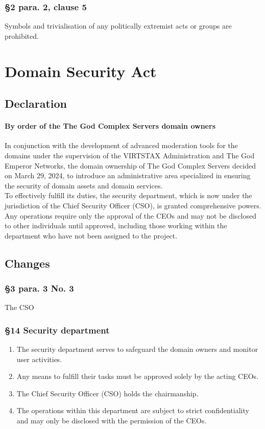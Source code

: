 \documentclass{cjs9}
\begin{document}
\subsubsection*{§2 para. 2, clause 5}
Symbols and trivialisation of any politically extremist acts or groups are prohibited.
\newpage
\section{Domain Security Act}
\subsection{Declaration}
\paragraph{By order of the The God Complex Servers domain owners\\}
In conjunction with the development of advanced moderation tools for the domains under the supervision of the VIRTSTAX Administration and The God Emperor Networks, the domain ownership of The God Complex Servers decided on March 29, 2024, to introduce an administrative area specialized in ensuring the security of domain assets and domain services.
\\To effectively fulfill its duties, the security department, which is now under the jurisdiction of the Chief Security Officer (CSO), is granted comprehensive powers. Any operations require only the approval of the CEOs and may not be disclosed to other individuals until approved, including those working within the department who have not been assigned to the project.
\subsection{Changes}
\subsubsection*{§3 para. 3 No. 3}
The CSO
\subsubsection*{§14 Security department}
\begin{enumerate}[(1)]
    \item The security department serves to safeguard the domain owners and monitor user activities.
    \item Any means to fulfill their tasks must be approved solely by the acting CEOs.
    \item The Chief Security Officer (CSO) holds the chairmanship.
    \item The operations within this department are subject to strict confidentiality and may only be disclosed with the permission of the CEOs.
\end{enumerate}
\newpage
\end{document}
